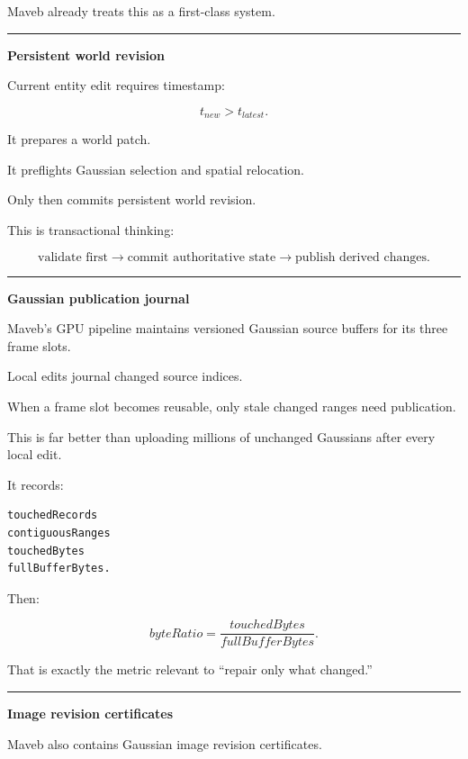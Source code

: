 Maveb already treats this as a first-class system.

\begin{center}\rule{0.5\linewidth}{0.5pt}\end{center}

\textbf{Persistent world revision}

Current entity edit requires timestamp:

\[
t_{new}
>
t_{latest}.
\]

It prepares a world patch.

It preflights Gaussian selection and spatial relocation.

Only then commits persistent world revision.

This is transactional thinking:

\[
\boxed{
\text{validate first}
\rightarrow
\text{commit authoritative state}
\rightarrow
\text{publish derived changes}.
}
\]

\begin{center}\rule{0.5\linewidth}{0.5pt}\end{center}

\textbf{Gaussian publication journal}

Maveb's GPU pipeline maintains versioned Gaussian source buffers for its three frame slots.

Local edits journal changed source indices.

When a frame slot becomes reusable, only stale changed ranges need publication.

This is far better than uploading millions of unchanged Gaussians after every local edit.

It records:

\protect{}\label{z2q1ht}%
\begin{verbatim}
touchedRecords
contiguousRanges
touchedBytes
fullBufferBytes.
\end{verbatim}

Then:

\[
\boxed{
byteRatio
=
\frac{
touchedBytes
}{
fullBufferBytes
}.
}
\]

That is exactly the metric relevant to ``repair only what changed.''

\begin{center}\rule{0.5\linewidth}{0.5pt}\end{center}

\textbf{Image revision certificates}

Maveb also contains Gaussian image revision certificates.

